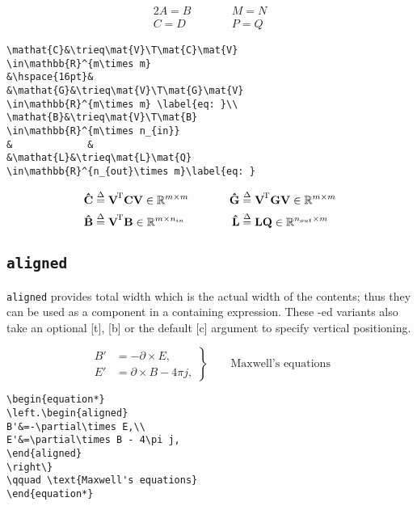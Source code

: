 \documentclass[journal]{IEEEtran}
\begin{document}
\begin{alignat}{2}
A=B  &\hspace{24pt}& M=N\nonumber\\
C=D  &             & P=Q
\end{alignat}

\begin{verbatim}
\mathat{C}&\trieq\mat{V}\T\mat{C}\mat{V}
\in\mathbb{R}^{m\times m} 
&\hspace{16pt}& 
&\mathat{G}&\trieq\mat{V}\T\mat{G}\mat{V}
\in\mathbb{R}^{m\times m} \label{eq: }\\
\mathat{B}&\trieq\mat{V}\T\mat{B}
\in\mathbb{R}^{m\times n_{in}} 
&             & 
&\mathat{L}&\trieq\mat{L}\mat{Q}
\in\mathbb{R}^{n_{out}\times m}\label{eq: }
\end{verbatim}

\begin{alignat}{3}
\mathat{C}&\trieq\mat{V}\T\mat{C}\mat{V}\in \mathbb{R}^{m\times m} &\hspace{16pt}& &\mathat{G}&\trieq\mat{V}\T\mat{G}\mat{V}\in \mathbb{R}^{m\times m} \\
\mathat{B}&\trieq\mat{V}\T\mat{B}\in \mathbb{R}^{m\times n_{in}} 
&             & 
&\mathat{L}&\trieq\mat{L}\mat{Q}\in \mathbb{R}^{n_{out}\times m}
\end{alignat}


\noindent \dotfill
\subsection{\texttt{aligned}}
\texttt{aligned} provides total width which is the actual width of the contents; thus they can be used as a component in a containing expression. These -ed variants also take an optional [t], [b]
or the default [c] argument to specify vertical positioning.

\begin{equation*}
\left.\begin{aligned}
B'&=-\partial\times E,\\
E'&=\partial\times B - 4\pi j,
\end{aligned}
\right\}
\qquad \text{Maxwell's equations}
\end{equation*}

\begin{verbatim}
\begin{equation*}
\left.\begin{aligned}
B'&=-\partial\times E,\\
E'&=\partial\times B - 4\pi j,
\end{aligned}
\right\}
\qquad \text{Maxwell's equations}
\end{equation*}
\end{verbatim}
\end{document}

